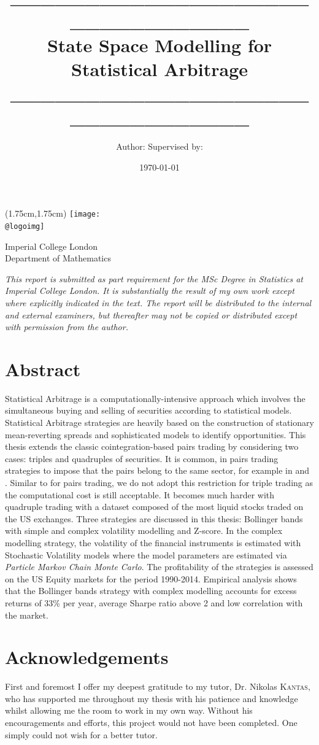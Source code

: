 \documentclass[11pt,a4,twosided,singlespacing,titlepagenumber=on]{scrreprt}
\title{\_\_\_\_\_\_\_\_\_\_\_\_\_\_\_\_\_\_\_\_\_\_\_\_\_\_\_\_\_\_\_\_ \\ State Space Modelling for Statistical Arbitrage \\ \_\_\_\_\_\_\_\_\_\_\_\_\_\_\_\_\_\_\_\_\_\_\_\_\_\_\_\_\_\_\_\_ }
\author{Author: \hfill Supervised by:}
\date{\today}
\makeatletter
\numberwithin{equation}{chapter} %
\theoremstyle{remark}
\renewcommand{\maketitle}{
\begin{titlepage}
\ifdefined\@logoimg
\begin{textblock*}{8cm}(1.75cm,1.75cm)
\texttt{[image: \\@logoimg]}
\end{textblock*}
\vspace*{1cm}

\vspace*{1cm}


\else
\fi
\begin{center}
\vspace*{\stretch{0.1}}
Imperial College London\\
Department of Mathematics\par
\vspace*{\stretch{1}} %
{\titlefont\Huge \@title\par} %
\vspace*{\stretch{2}}
{\large \textit{\@author} \par}
\vspace*{\stretch{0.1}}
{\large \@supervisor \par}
\vspace*{\stretch{3}}
\@date
\vspace*{\stretch{1}}

\end{center}%
\textit{
This report is submitted as part requirement for the MSc Degree in Statistics at Imperial College London. It is substantially the result of my own work except where explicitly indicated in the text. The report will be distributed to the internal and external examiners, but thereafter may not be copied or distributed except with permission from the author.}
\vspace*{\stretch{0.1}}
\end{titlepage}%
}
\makeatother
\begin{document}


\maketitle

\section*{Abstract}
Statistical Arbitrage is a computationally-intensive approach which involves the simultaneous buying and selling of securities according to statistical models. Statistical Arbitrage strategies are heavily based on the construction of stationary mean-reverting spreads and sophisticated models to identify opportunities. This thesis extends the classic cointegration-based pairs trading by considering two cases: triples and quadruples of securities. It is common, in pairs trading strategies to impose that the pairs belong to the same sector, for example in \cite{chan2009} and \cite{dunis2010}. Similar to \cite{caldeira2013} for pairs trading, we do not adopt this restriction for triple trading as the computational cost is still acceptable. It becomes much harder with quadruple trading with a dataset composed of the most liquid stocks traded on the US exchanges. Three strategies are discussed in this thesis: Bollinger bands with simple and complex volatility modelling and Z-score. In the complex modelling strategy, the volatility of the financial instruments is estimated with Stochastic Volatility models where the model parameters are estimated via \textit{Particle Markov Chain Monte Carlo}. The profitability of the strategies is assessed on the US Equity markets for the period 1990-2014. Empirical analysis shows that the Bollinger bands strategy with complex modelling accounts for excess returns of 33\% per year, average Sharpe ratio above 2 and low correlation with the market.

\section*{Acknowledgements}
First and foremost I offer my deepest gratitude to my tutor, Dr. Nikolas \textsc{Kantas}, who has supported me throughout my thesis with his patience and knowledge whilst allowing me the room to work in my own way. Without his encouragements and efforts, this project would not have been completed. One simply could not wish for a better tutor. \\
\end{document}
